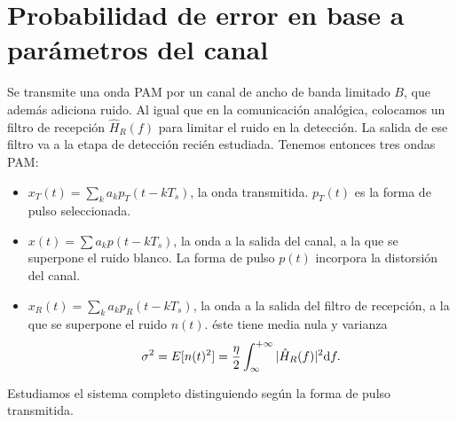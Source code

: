 \section{Probabilidad de error en base a parámetros del canal} %

\begin{figure}[htb]
    \centering
    \resizebox{\textwidth}{!}{%
    
    }
\end{figure}

Se transmite una onda PAM por un canal de ancho de banda limitado
$B$, que además adiciona ruido. Al igual que en la comunicación
analógica, colocamos un filtro de recepción $\hat{H}_R(f)$ para
limitar el ruido en la detección. La salida de ese filtro va a la
etapa de detección recién estudiada. Tenemos entonces tres ondas
PAM:
\begin{itemize}
\item $x_T(t)= \sum_k a_k p_T(t-kT_s)$, la onda transmitida.
$p_T(t)$ es la forma de pulso seleccionada.
\item $x(t)=\sum a_k p(t-kT_s)$, la onda a la salida del canal,
a la que se superpone el ruido blanco. La forma de pulso $p(t)$
incorpora la distorsión del canal.
\item $x_R(t) = \sum_k a_k
p_R(t-kT_s)$, la onda a la salida del filtro de recepción, a la
que se superpone el ruido $n(t)$. éste tiene media nula y
varianza
\[\sigma^2=E[n(t)^2]=\frac{\eta}{2}\displaystyle\int^{+\infty}_{\infty}
|\hat{H}_R(f)|^2\mathrm{d} f.\]
\end{itemize}
Estudiamos el sistema completo distinguiendo según la forma de
pulso transmitida.

